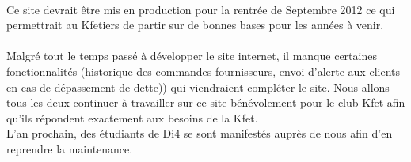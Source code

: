 \documentclass[twoside,UTF8]{EPURapport}
\begin{document}
\paragraph{}
Ce site devrait être mis en production pour la rentrée de Septembre 2012 ce qui permettrait au Kfetiers de partir sur de bonnes bases pour les années à venir.

\paragraph{}
Malgré tout le temps passé à développer le site internet, il manque certaines fonctionnalités (historique des commandes fournisseurs, envoi d'alerte aux clients en cas de dépassement de dette)) qui viendraient compléter le site. Nous allons tous les deux continuer à travailler sur ce site bénévolement pour le club Kfet afin qu'ils répondent exactement aux besoins de la Kfet.\\
L'an prochain, des étudiants de Di4 se sont manifestés auprès de nous afin d'en reprendre la maintenance.


\end{document}
